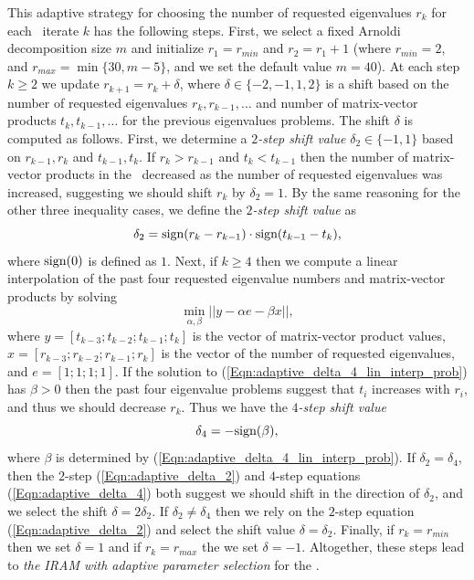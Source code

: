 This adaptive strategy for choosing the number of requested eigenvalues $r_k$ for each \emep \ iterate $k$ has the following steps.
First, we select a fixed Arnoldi decomposition size $m$ and initialize $r_1=r_{min}$ and $r_2 = r_1+1$ (where $r_{min}=2$, and $r_{max} = \min\{ 30, m-5 \}$, and we set the default value $m=40$).  
At each step $k \geq 2$ we update $r_{k+1} =  r_k + \delta$, where $\delta \in \{-2, -1, 1, 2\}$ is a shift based on the number of requested eigenvalues $r_k, r_{k-1}, \ldots$ and number of matrix-vector products $t_k, t_{k-1}, \ldots$ for the previous eigenvalues problems.
The shift $\delta$ is computed as follows.
First, we determine a \textit{$2$-step shift value} $\delta_2 \in \{-1, 1\}$ based on $r_{k-1}, r_k$ and $t_{k-1}, t_k$.
If $r_k > r_{k-1}$ and $t_k < t_{k-1}$ then the number of matrix-vector products in the \emep \ decreased as the number of requested eigenvalues was increased, suggesting we should shift $r_k$ by $\delta_2 = 1$.
By the same reasoning for the other three inequality cases, we define the
\textit{$2$-step shift value} as
\begin{equation}				\label{Eqn:adaptive_delta_2}
\delta_2 = \textnormal{sign}(r_k - r_{k-1}) \cdot \textnormal{sign}(t_{k-1} - t_k),
\end{equation}
where $\textnormal{sign}(0)$ is defined as $1$.
Next, if $k \geq 4$ then we compute a linear interpolation of the past four requested eigenvalue numbers and matrix-vector products by solving
\begin{equation} 			\label{Eqn:adaptive_delta_4_lin_interp_prob}
\min_{\alpha, \beta} || y - \alpha e - \beta x ||,
\end{equation}
where $y = [t_{k-3}; t_{k-2}; t_{k-1}; t_k]$ is the vector of matrix-vector product values, $x = [r_{k-3}; r_{k-2}; r_{k-1}; r_k]$ is the vector of the number of requested eigenvalues, and $e = [1;1;1;1]$.
If the solution to (\ref{Eqn:adaptive_delta_4_lin_interp_prob}) has $\beta > 0$ then the past four eigenvalue problems suggest that $t_i$ increases with $r_i$, and thus we should decrease $r_k$.
Thus we have the \textit{$4$-step shift value}
\begin{equation}			\label{Eqn:adaptive_delta_4}
\delta_4 = -\textnormal{sign}(\beta),
\end{equation}
where $\beta$ is determined by (\ref{Eqn:adaptive_delta_4_lin_interp_prob}).
If $\delta_2 = \delta_4$, then the $2$-step (\ref{Eqn:adaptive_delta_2}) and $4$-step equations (\ref{Eqn:adaptive_delta_4}) both suggest we should shift in the direction of $\delta_2$, and we select the shift $\delta = 2\delta_2$.
If $\delta_2 \neq \delta_4$ then we rely on the $2$-step equation (\ref{Eqn:adaptive_delta_2}) and select the shift value $\delta = \delta_2$.
Finally, if $r_k = r_{min}$ then we set $\delta = 1$ and if $r_k = r_{max}$ the we set $\delta = -1$.
Altogether, these steps lead to \textit{the IRAM with adaptive parameter selection} for the \emep.



